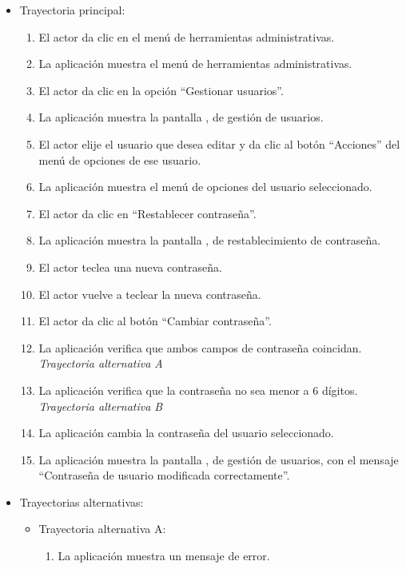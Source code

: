 			\begin{itemize}
				\item Trayectoria principal:
					\begin{enumerate}
						\item El actor da clic en el menú de herramientas administrativas.
						\item La aplicación muestra el menú de herramientas administrativas.
						\item El actor da clic en la opción ``Gestionar usuarios''.
						\item La aplicación muestra la pantalla , de gestión de usuarios.
						\item El actor elije el usuario que desea editar y da clic al botón ``Acciones'' del menú de opciones de ese usuario.
						\item La aplicación muestra el menú de opciones del usuario seleccionado.
						\item El actor da clic en ``Restablecer contraseña''.
						\item La aplicación muestra la pantalla , de restablecimiento de contraseña.
						\item El actor teclea una nueva contraseña.
						\item El actor vuelve a teclear la nueva contraseña.
						\item El actor da clic al botón ``Cambiar contraseña''.
						\item La aplicación verifica que ambos campos de contraseña coincidan. \textsl{Trayectoria alternativa A}
						\item La aplicación verifica que la contraseña no sea menor a 6 dígitos. \textsl{Trayectoria alternativa B}
						\item La aplicación cambia la contraseña del usuario seleccionado.
						\item La aplicación muestra la pantalla , de gestión de usuarios, con el mensaje ``Contraseña de usuario modificada correctamente''.

					\end{enumerate}
				\item Trayectorias alternativas:
					\begin{itemize}
						\item Trayectoria alternativa A:
							\begin{enumerate}
								\item La aplicación muestra un mensaje de error.
							\end{enumerate}
					\end{itemize}
			\end{itemize}
			
